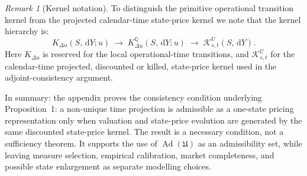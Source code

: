 \documentclass[11pt]{amsart}
\newcommand{\Q}{\mathbb{Q}}
\newcommand{\dd}{\,\mathrm{d}}
\newcommand{\Ad}{\operatorname{Ad}}
\theoremstyle{definition}
\theoremstyle{plain}
\theoremstyle{remark}
\newtheorem{remark}{Remark}
\begin{document}
\begin{remark}[Kernel notation]
To distinguish the primitive operational transition kernel from the projected calendar-time state-price kernel we note that the kernel hierarchy is:
\[
K_{\Delta u}(S,\dd Y;u)
 \;\longrightarrow\;
K^{\Q}_{\Delta u}(S,\dd Y;u)
 \;\longrightarrow\;
{\mathcal K^U_{s,t}(S,\dd Y)} .
\]
Here $K_{\Delta u}$ is reserved for the local operational-time transitions, and $\mathcal K^U_{s,t}$ for the calendar-time projected, discounted or killed, state-price kernel used in the adjoint-consistency argument.
\end{remark}

In summary: the appendix proves the consistency condition underlying Proposition~1: a non-unique time projection is admissible as a one-state pricing representation only when valuation and state-price evolution are generated by the same discounted state-price kernel.  The result is a necessary condition, not a sufficiency theorem.  It supports the use of $\Ad(\mathfrak U)$ as an admissibility set, while leaving measure selection, empirical calibration, market completeness, and possible state enlargement as separate modelling choices.
\end{document}

